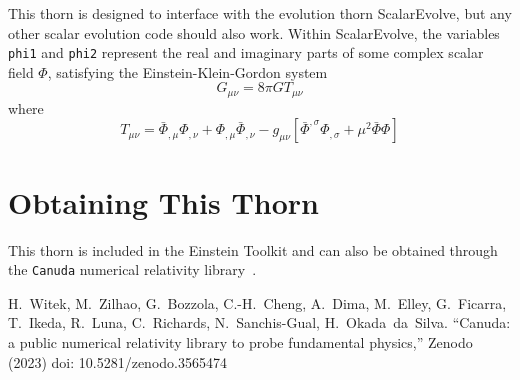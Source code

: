 This thorn is designed to interface with the evolution thorn ScalarEvolve, but any other scalar evolution code should also work. Within ScalarEvolve, the variables \texttt{phi1} and \texttt{phi2} represent the real and imaginary parts of some complex scalar field $\Phi$, satisfying the Einstein-Klein-Gordon system
\begin{equation}
  G_{\mu \nu} = 8 \pi G T_{\mu \nu}
\end{equation}
where
\begin{equation}
  T_{\mu \nu} = \bar \Phi_{,\mu} \Phi_{,\nu} + \Phi_{,\mu} \bar \Phi_{,\nu}
                - g_{\mu \nu} [  \bar \Phi^{,\sigma} \Phi_{,\sigma}
                               + \mu^2 \bar \Phi \Phi ]
\end{equation}


\section{Obtaining This Thorn}

This thorn is included in the Einstein Toolkit and can also be obtained through the \texttt{Canuda} numerical relativity library~\cite{Canuda}.

\begin{thebibliography}{9}

H.~Witek, M.~Zilhao, G.~Bozzola, C.-H.~Cheng, A.~Dima, M.~Elley, G.~Ficarra, T.~Ikeda, R.~Luna, C.~Richards, N.~Sanchis-Gual, H.~Okada~da~Silva.
``Canuda: a public numerical relativity library to probe fundamental physics,''
Zenodo (2023)
doi: 10.5281/zenodo.3565474

\end{thebibliography}



